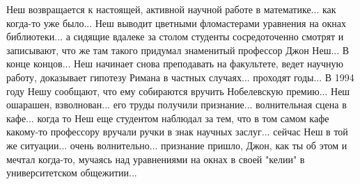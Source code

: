 Неш возвращается к настоящей, активной научной работе в математике... как
когда-то уже было...  Неш выводит цветными фломастерами уравнения на окнах
библиотеки... а сидящие вдалеке за столом студенты сосредоточенно смотрят и
записывают, что же там такого придумал знаменитый профессор Джон Неш...  В
конце концов... Неш начинает снова преподавать на факультете, ведет научную
работу, доказывает гипотезу Римана в частных случаях... проходят годы...  В
1994 году Нешу сообщают, что ему собираются вручить Нобелевскую премию...  Неш
ошарашен, взволнован... его труды получили признание... волнительная сцена в
кафе...  когда то Неш еще студентом наблюдал за тем, что в том самом кафе
какому-то профессору вручали ручки в знак научных заслуг... сейчас Неш в той же
ситуации... очень волнительно...  признание пришло, Джон, как ты об этом и
мечтал когда-то, мучаясь над уравнениями на окнах в своей "келии" в
университетском общежитии...


